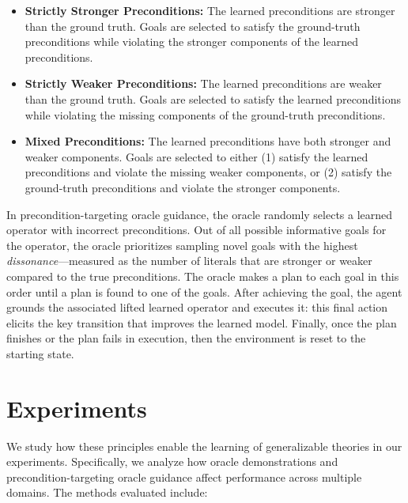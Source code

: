 \begin{itemize}
    \item \textbf{Strictly Stronger Preconditions:} The learned preconditions are stronger than the ground truth. Goals are selected to satisfy the ground-truth preconditions while violating the stronger components of the learned preconditions.
    
    \item \textbf{Strictly Weaker Preconditions:} The learned preconditions are weaker than the ground truth. Goals are selected to satisfy the learned preconditions while violating the missing components of the ground-truth preconditions. 
    
    \item \textbf{Mixed Preconditions:} The learned preconditions have both stronger and weaker components. Goals are selected to either (1) satisfy the learned preconditions and violate the missing weaker components, or (2) satisfy the ground-truth preconditions and violate the stronger components.    
\end{itemize}

In precondition-targeting oracle guidance, the oracle randomly selects a learned operator with incorrect preconditions. Out of all possible informative goals for the operator, the oracle prioritizes sampling novel goals with the highest \textit{dissonance}—measured as the number of literals that are stronger or weaker compared to the true preconditions. The oracle makes a plan to each goal in this order until a plan is found to one of the goals. After achieving the goal, the agent grounds the associated lifted learned operator and executes it: this final action elicits the key transition that improves the learned model. Finally, once the plan finishes or the plan fails in execution, then the environment is reset to the starting state.

\section{Experiments}
We study how these principles enable the learning of generalizable theories in our experiments. Specifically, we analyze how oracle demonstrations and precondition-targeting oracle guidance affect performance across multiple domains. The methods evaluated include:

